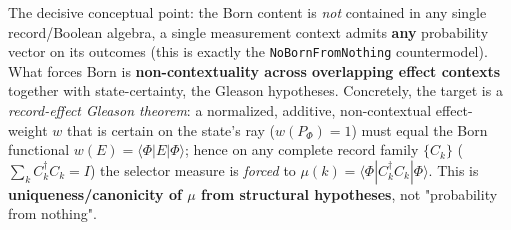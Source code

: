 \documentclass[11pt,a4paper]{article}
\begin{document}
The decisive conceptual point: the Born content is \emph{not} contained in any single record/Boolean algebra, a single measurement context admits \textbf{any} probability vector on its outcomes (this is exactly the \texttt{NoBornFromNothing} countermodel). What forces Born is \textbf{non-contextuality across overlapping effect contexts} together with state-certainty, the Gleason hypotheses. Concretely, the target is a \emph{record-effect Gleason theorem}: a normalized, additive, non-contextual effect-weight $w$ that is certain on the state's ray ($w(P_\Phi)=1$) must equal the Born functional $w(E)=\langle\Phi|E|\Phi\rangle$; hence on any complete record family $\{C_k\}$ ($\sum_k C_k^\dagger C_k = I$) the selector measure is \emph{forced} to $\mu(k) = \langle\Phi|C_k^\dagger C_k|\Phi\rangle$. This is \textbf{uniqueness/canonicity of $\mu$ from structural hypotheses}, not "probability from nothing".
\end{document}
